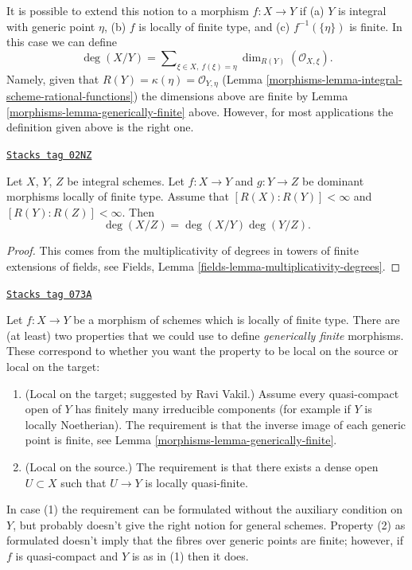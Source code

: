It is possible to extend this notion to a morphism
$f : X \to Y$ if (a) $Y$ is integral with generic point $\eta$,
(b) $f$ is locally of finite type, and (c) $f^{-1}(\{\eta\})$ is finite.
In this case we can define
$$
\deg(X/Y)
=
\sum\nolimits_{\xi \in X, \ f(\xi) = \eta}
\dim_{R(Y)} (\mathcal{O}_{X, \xi}).
$$
Namely, given that $R(Y) = \kappa(\eta) = \mathcal{O}_{Y, \eta}$
(Lemma \ref{morphisms-lemma-integral-scheme-rational-functions})
the dimensions above are finite by
Lemma \ref{morphisms-lemma-generically-finite} above.
However, for most applications the definition given above
is the right one.

\begin{lemma}
\label{morphisms-lemma-degree-composition}
\href{https://stacks.math.columbia.edu/tag/02NZ}{\texttt{Stacks tag 02NZ}}

Let $X$, $Y$, $Z$ be integral schemes.
Let $f : X \to Y$ and $g : Y \to Z$ be dominant morphisms locally
of finite type. Assume that $[R(X) : R(Y)] < \infty$ and
$[R(Y) : R(Z)] < \infty$. Then
$$
\deg(X/Z) = \deg(X/Y) \deg(Y/Z).
$$
\end{lemma}

\begin{proof}
This comes from the multiplicativity of degrees in towers
of finite extensions of fields, see
Fields, Lemma \ref{fields-lemma-multiplicativity-degrees}.
\end{proof}

\begin{remark}
\label{morphisms-remark-definition-generically-finite}
\href{https://stacks.math.columbia.edu/tag/073A}{\texttt{Stacks tag 073A}}

Let $f : X \to Y$ be a morphism of schemes which is locally of finite type.
There are (at least) two properties that we could use to define
{\it generically finite} morphisms. These correspond to whether you
want the property to be local on the source or local on the target:
\begin{enumerate}
\item (Local on the target; suggested by Ravi Vakil.)
Assume every quasi-compact open of $Y$ has finitely
many irreducible components (for example if $Y$ is locally Noetherian).
The requirement is that the inverse image of each generic point is finite, see
Lemma \ref{morphisms-lemma-generically-finite}.
\item (Local on the source.) The requirement is that there exists
a dense open $U \subset X$ such that $U \to Y$ is locally quasi-finite.
\end{enumerate}
In case (1) the requirement can be formulated without the auxiliary
condition on $Y$, but probably doesn't give the right notion for
general schemes. Property (2) as formulated doesn't imply that the fibres
over generic points are finite; however, if $f$ is
quasi-compact and $Y$ is as in (1) then it does.
\end{remark}

